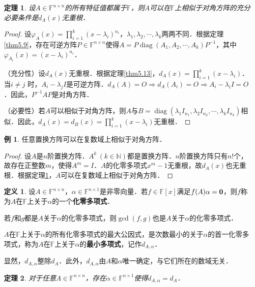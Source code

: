 \documentclass[a4paper,fontset=windows]{ctexbook}
\newtheorem{theorem}{定理}[chapter]
\theoremstyle{definition}
\newtheorem{definition}{定义}[chapter]
\newtheorem{example}{例}[chapter]
\DeclareMathOperator{\diag}{diag}
\begin{document}
\begin{theorem}\label{thm5.14}
设$A\in\mathbb{F}^{n\times n}$的所有特征值都属于$\mathbb{F}$，则$A$可以在$\mathbb{F}$上相似于对角方阵的充分必要条件是$d_A(x)$无重根．
\end{theorem}

\begin{proof}
设$\varphi_A(x)=\prod\limits_{i=1}^k(x-\lambda_i)^{n_i}$，$\lambda_1,\lambda_2,\cdots,\lambda_k$两两不同．根据定理\ref{thm5.9}，存在可逆方阵$P\in\mathbb{F}^{n\times n}$使得$A=P\diag(A_1,A_2,\cdots,A_k)P^{-1}$，其中$\varphi_{A_i}(x)=(x-\lambda_i)^{n_i}$．

（充分性）设$d_A(x)$无重根．根据定理\ref{thm5.13}，$d_A(x)=\prod\limits_{i=1}^k(x-\lambda_i)$．当$i\ne j$ 时，$A_i-\lambda_jI$是可逆方阵．$d_A(A)=O\Rightarrow d_A(A_i)=O\Rightarrow A_i-\lambda_iI=O$．因此，$P^{-1}AP$是对角方阵．

（必要性）若$A$可以相似于对角方阵，则$A$与$B=\diag(\lambda_1I_{n_1},\lambda_2I_{n_2},\cdots,\lambda_kI_{n_k})$相似．因此，$d_A(x)=d_B(x)=\prod\limits_{i=1}^k(x-\lambda_i)$无重根．
\end{proof}

\begin{example}
任意置换方阵可以在复数域上相似于对角方阵．
\end{example}

\begin{proof}
设$A$是$n$阶置换方阵．$A^k~(k\in\mathbb{N})$都是置换方阵．$n$阶置换方阵只有$n!$个，故存在正整数$m$，使得$A^m=I$．$A$的化零多项式$x^m-1$无重根，故$d_A(x)$也无重根．根据定理\ref{thm5.14}，$A$可以在复数域上相似于对角方阵．
\end{proof}

\begin{definition}
设$A\in\mathbb{F}^{n\times n}$，$\alpha\in\mathbb{F}^{n\times 1}$是非零向量．若$f\in\mathbb{F}[x]$满足$f(A)\alpha={\bf 0}$，则$f$称为$A$在$\mathbb{F}$上关于$\alpha$的一个{\bf 化零多项式}．

若$f$和$g$都是$A$关于$\alpha$的化零多项式，则$\gcd(f,g)$也是$A$关于$\alpha$的化零多项式．

$A$在$\mathbb{F}$上关于$\alpha$的所有化零多项式的最大公因式，是次数最小的关于$\alpha$的首一化零多项式，称为$A$在$\mathbb{F}$上关于$\alpha$的{\bf 最小多项式}，记作$d_{A,\alpha}$．
\end{definition}

显然，$d_{A,\alpha}$整除$d_A$．此外，$d_{A,\alpha}$由$A$和$\alpha$唯一确定，与它们所在的数域无关．

\begin{theorem}\label{thm5.15}
对于任意$A\in\mathbb{F}^{n\times n}$，存在$\alpha\in\mathbb{F}^{n\times 1}$使得$d_{A,\alpha}=d_A$．
\end{theorem}
\end{document}
